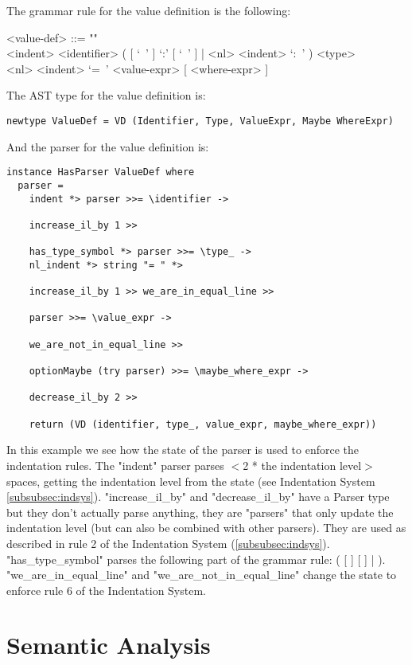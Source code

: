 \documentclass{article}
\begin{document}
The grammar rule for the value definition is the following:
\begin{grammar}
<value-def> ::= ""\\
<indent> <identifier> 
( [ `\ ' ] `:' [ `\ ' ] | <nl> <indent> `:\ ' ) <type>  \\
<nl> <indent> `=\ ' <value-expr> [ <where-expr> ]
\\
\end{grammar}
The AST type for the value definition is:
\begin{verbatim}
newtype ValueDef = VD (Identifier, Type, ValueExpr, Maybe WhereExpr)

\end{verbatim}
And the parser for the value definition is:
\begin{verbatim}
instance HasParser ValueDef where
  parser = 
    indent *> parser >>= \identifier ->

    increase_il_by 1 >>

    has_type_symbol *> parser >>= \type_ ->
    nl_indent *> string "= " *>

    increase_il_by 1 >> we_are_in_equal_line >>

    parser >>= \value_expr ->

    we_are_not_in_equal_line >>

    optionMaybe (try parser) >>= \maybe_where_expr ->

    decrease_il_by 2 >>

    return (VD (identifier, type_, value_expr, maybe_where_expr))

\end{verbatim}
In this example we see how the state of the parser is used to enforce the
indentation rules. The "indent" parser parses $<$2 * the indentation level$>$
spaces, getting the indentation level from the state (see Indentation System
\ref{subsubsec:indsys}).  "increase_il_by" and "decrease_il_by" have a Parser
type but they don't actually parse anything, they are "parsers" that only
update the indentation level (but can also be combined with other parsers).
They are used as described in rule 2 of the Indentation System
(\ref{subsubsec:indsys}). "has_type_symbol" parses the following part of 
the grammar rule:
( [ \lit{\ } ] \lit{:} [ \lit{\ } ]
\verb|||   \lit{:\ }).
"we_are_in_equal_line" and "we_are_not_in_equal_line" change the state 
to enforce rule 6 of the Indentation System.

\section{Semantic Analysis}
\end{document}
